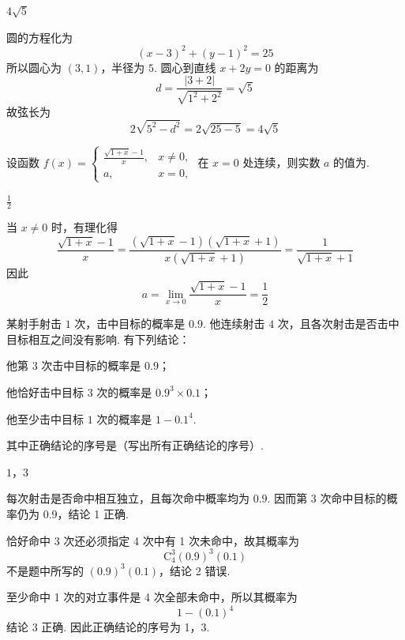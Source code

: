 \begin{answer}\(4\sqrt{5}\)\end{answer}

\begin{solution}
圆的方程化为
\[
(x-3)^2+(y-1)^2=25
\]
所以圆心为 \((3,1)\)，半径为 \(5\).  圆心到直线 \(x+2y=0\) 的距离为
\[
d=\frac{|3+2|}{\sqrt{1^2+2^2}}=\sqrt5
\]
故弦长为
\[
2\sqrt{5^2-d^2}=2\sqrt{25-5}=4\sqrt5
\]
\end{solution}

\begin{problem}
设函数 \(f(x)=\begin{cases}
\frac{\sqrt{1+x}-1}{x}, & x\neq 0,\\
a, & x=0,
\end{cases}\) 在 \(x=0\) 处连续，则实数 \(a\) 的值为\fillinblank{}.
\end{problem}

\begin{answer}\(\frac{1}{2}\)\end{answer}

\begin{solution}
当 \(x\ne0\) 时，有理化得
\[
\frac{\sqrt{1+x}-1}{x}
 =\frac{(\sqrt{1+x}-1)(\sqrt{1+x}+1)}{x(\sqrt{1+x}+1)}
 =\frac{1}{\sqrt{1+x}+1}
\]
因此
\[
a=\lim_{x\to0}\frac{\sqrt{1+x}-1}{x}=\frac12
\]
\end{solution}

\begin{problem}
某射手射击 \(1\) 次，击中目标的概率是 \(0.9\). 他连续射击 \(4\) 次，且各次射击是否击中目标相互之间没有影响. 有下列结论：

\begin{circlelist}
\item 他第 \(3\) 次击中目标的概率是 \(0.9\)；
\item 他恰好击中目标 \(3\) 次的概率是 \(0.9^3\times 0.1\)；
\item 他至少击中目标 \(1\) 次的概率是 \(1-0.1^4\).
\end{circlelist}

其中正确结论的序号是\fillinblank{}（写出所有正确结论的序号）.
\end{problem}

\begin{answer}\(1\)，\(3\)\end{answer}

\begin{solution}
每次射击是否命中相互独立，且每次命中概率均为 \(0.9\).  因而第 3 次命中目标的概率仍为 \(0.9\)，结论 1 正确.

恰好命中 3 次还必须指定 4 次中有 1 次未命中，故其概率为
\[
\mathrm C_4^3(0.9)^3(0.1)
\]
不是题中所写的 \((0.9)^3(0.1)\)，结论 2 错误.

至少命中 1 次的对立事件是 4 次全部未命中，所以其概率为
\[
1-(0.1)^4
\]
结论 3 正确.  因此正确结论的序号为 1，3.
\end{solution}

